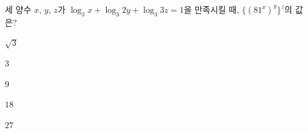 세 양수 $x$, $y$, $z$가 $\log_3 x+\log_3 2y+\log_3 3z=1$을 만족시킬 때, $\{(81^x)^y\}^z$의 값은?
\begin{choices32}{\rule[-3ex]{0pt}{8ex}$\sqrt{3}$}{\rule[-3ex]{0pt}{8ex}$3$}{\rule[-3ex]{0pt}{8ex}$9$}{\rule[-3ex]{0pt}{8ex}$18$}{\rule[-3ex]{0pt}{8ex}$27$}\end{choices32}
